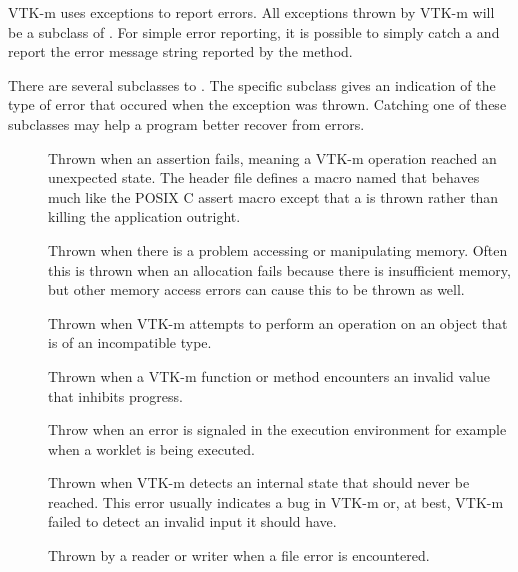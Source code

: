 
VTK-m uses exceptions to report errors. All exceptions thrown by VTK-m will
be a subclass of . For simple error reporting, it is
possible to simply catch a  and report the error message
string reported by the  method.


There are several subclasses to . The specific subclass
gives an indication of the type of error that occured when the exception
was thrown. Catching one of these subclasses may help a program better
recover from errors.
\begin{description}
\item[]  
  Thrown when an assertion fails, meaning a VTK-m operation reached an
  unexpected state. The header file 
  defines a macro named  that behaves much
  like the POSIX C assert macro except that a
   is thrown rather than killing the
  application outright.
\item[] Thrown when there is a problem
  accessing or manipulating memory. Often this is thrown when an allocation
  fails because there is insufficient memory, but other memory access
  errors can cause this to be thrown as well.
\item[] Thrown when VTK-m attempts to perform
  an operation on an object that is of an incompatible type.
\item[] Thrown when a VTK-m function or
  method encounters an invalid value that inhibits progress.
\item[]  Throw
  when an error is signaled in the execution environment for example when a
  worklet is being executed.
\item[] Thrown when VTK-m detects an
  internal state that should never be reached. This error usually indicates
  a bug in VTK-m or, at best, VTK-m failed to detect an invalid input it
  should have.
\item[] Thrown by a reader or writer when a file error is
  encountered.
\end{description}



